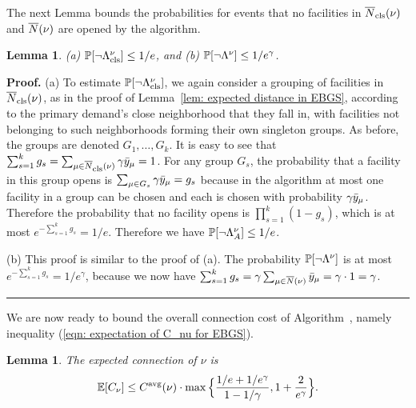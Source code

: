 \documentclass[oneside,final]{ucr}
\newtheorem{lemma}[theorem]{Lemma}
\newenvironment{proof}[1][Proof]{\textbf{#1.} }{\ \rule{0.5em}{0.5em}}
\begin{document}
The next Lemma bounds the probabilities for events
that no facilities in ${\overline{N}}_{{\mbox{\scriptsize\rm cls}}}(\nu)$ and ${\overline{N}}(\nu)$ are
opened by the algorithm.


\begin{lemma}\label{lem: close and far neighbor probability}
{\rm (a)} $\mathbb{P}[\neg\Lambda^\nu_{{\mbox{\scriptsize\rm cls}}}] \le 1/e$, and
{\rm (b)} $\mathbb{P}[\neg\Lambda^\nu] \le 1/e^\gamma$.
\end{lemma}

\begin{proof}
  (a) To estimate $\mathbb{P}[\neg\Lambda^\nu_{{\mbox{\scriptsize\rm cls}}}]$, we again consider a
  grouping of facilities in ${\overline{N}}_{{\mbox{\scriptsize\rm cls}}}(\nu)$, as in the proof of
  Lemma~\ref{lem: expected distance in EBGS}, according to the primary
  demand's close neighborhood that they fall in, with facilities not
  belonging to such neighborhoods forming their own singleton groups.
  As before, the groups are denoted $G_1, \ldots, G_k$. It is easy to
  see that $\sum_{s=1}^k g_s = \sum_{\mu \in {\overline{N}}_{{\mbox{\scriptsize\rm cls}}}(\nu)} \gamma
  {\bar y}_{\mu} = 1$. For any group $G_s$, the probability that a
  facility in this group opens is $\sum_{\mu \in G_s} \gamma
  {\bar y}_{\mu} = g_s$ because in the algorithm at most one facility in
  a group can be chosen and each is chosen with probability $\gamma
  {\bar y}_{\mu}$. Therefore the probability that no facility 
  opens is $\prod_{s=1}^k (1 - g_s)$, which is
  at most $e^{-\sum_{s=1}^k g_s} = 1/e$. Therefore we have
  $\mathbb{P}[\neg\Lambda^\nu_A] \leq 1/e$.

(b)
  This proof is similar to the proof of (a). The probability $\mathbb{P}[\neg\Lambda^\nu]$ is at most
  $e^{-\sum_{s=1}^k g_s} = 1/e^\gamma$, because we now have
  $\sum_{s=1}^k g_s = \gamma \sum_{\mu \in {\overline{N}}(\nu)} {\bar y}_{\mu} =
  \gamma \cdot 1 = \gamma$.
\end{proof}


We are now ready to bound the overall connection cost of
Algorithm~{\EBGS}, namely inequality (\ref{eqn: expectation of C_nu for EBGS}).


\begin{lemma}\label{lem: EBGS nu's connection cost}
The expected connection of $\nu$ is
%
\begin{equation*}
\mathbb{E}[C_\nu] \le
  C^{{\mbox{\scriptsize\rm avg}}}(\nu)\cdot\max\Big\{\frac{1/e+1/e^\gamma}{1-1/\gamma}, 1+\frac{2}{e^\gamma}\Big\}.
\end{equation*}
\end{lemma}
\end{document}
